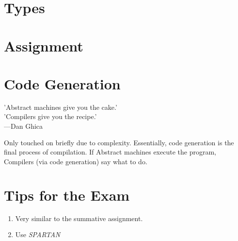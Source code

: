 \documentclass{article}
\begin{document}
\section{Types}



\section{Assignment}

\section{Code Generation}

\begin{displayquote}
   'Abstract machines give you the cake.'\\
   'Compilers give you the recipe.'\\
   ---Dan Ghica
\end{displayquote}

Only touched on briefly due to complexity. Essentially, code generation is the final process of compilation. If Abstract machines execute the program, Compilers (via code generation) say what to do. 

\section{Tips for the Exam}
\begin{enumerate}
    \item Very similar to the summative assignment.
    \item Use \textit{SPARTAN}
\end{enumerate}
\end{document}
